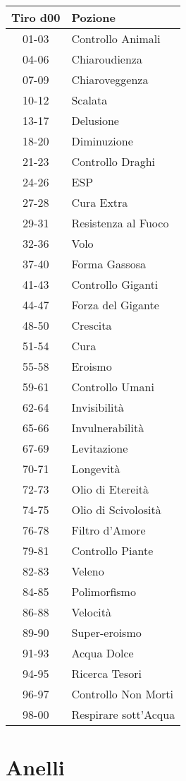 \documentclass{article}
\begin{document}
\begin{multicols}{2}
\begin{tabular}{|c|l|}
\hline
\textbf{Tiro d00} & \textbf{Pozione} \\
\hline
01-03 & Controllo Animali \\
04-06 & Chiaroudienza \\
07-09 & Chiaroveggenza \\
10-12 & Scalata \\
13-17 & Delusione \\
18-20 & Diminuzione \\
21-23 & Controllo Draghi \\
24-26 & ESP \\
27-28 & Cura Extra \\
29-31 & Resistenza al Fuoco \\
32-36 & Volo \\
37-40 & Forma Gassosa \\
41-43 & Controllo Giganti \\
44-47 & Forza del Gigante \\
48-50 & Crescita \\
51-54 & Cura \\
55-58 & Eroismo \\
59-61 & Controllo Umani \\
62-64 & Invisibilità \\
65-66 & Invulnerabilità \\
67-69 & Levitazione \\
70-71 & Longevità \\
72-73 & Olio di Etereità \\
74-75 & Olio di Scivolosità \\
76-78 & Filtro d'Amore \\
79-81 & Controllo Piante \\
82-83 & Veleno \\
84-85 & Polimorfismo \\
86-88 & Velocità \\
89-90 & Super-eroismo \\
91-93 & Acqua Dolce \\
94-95 & Ricerca Tesori \\
96-97 & Controllo Non Morti \\
98-00 & Respirare sott'Acqua \\
\hline

\end{tabular}



\section{Anelli}


\end{multicols}
\end{document}
